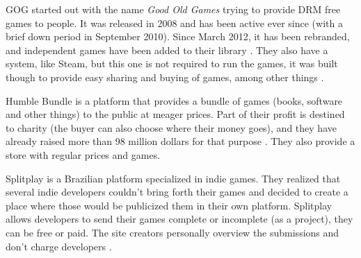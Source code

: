 GOG started out with the name \textit{Good Old Games} trying to provide DRM free games to people. It was released in 2008 and has been active ever since (with a brief down period in September 2010). Since March 2012, it has been rebranded, and independent games have been added to their library \cite{wikipedia2017gog}. They also have a system, like Steam, but this one is not required to run the games, it was built though to provide easy sharing and buying of games, among other things \cite{gog2017}.

Humble Bundle is a platform that provides a bundle of games (books, software and other things) to the public at meager prices. Part of their profit is destined to charity (the buyer can also choose where their money goes), and they have already raised more than 98 million dollars for that purpose \cite{humblebundle2017}. They also provide a store with regular prices and games.

Splitplay is a Brazilian platform specialized in indie games. They realized that several indie developers couldn't bring forth their games and decided to create a place where those would be publicized them in their own platform. Splitplay allows developers to send their games complete or incomplete (as a project), they can be free or paid. The site creators personally overview the submissions and don't charge developers \cite{splitplay2017}.
